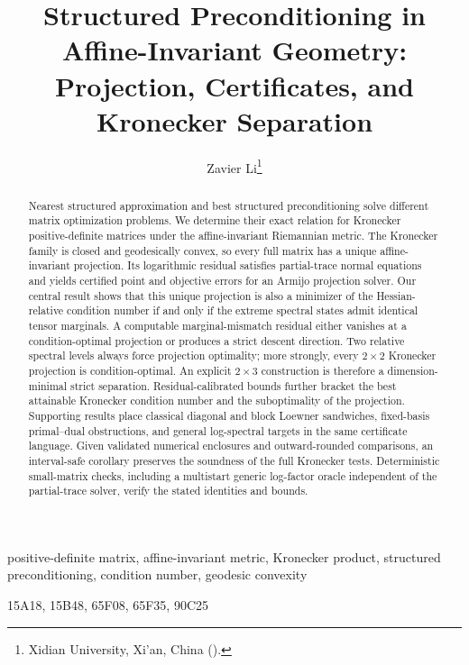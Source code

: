 \documentclass[review,onefignum,onetabnum]{siamart250211}
\title{Structured Preconditioning in Affine-Invariant Geometry:
Projection, Certificates, and Kronecker Separation}
\author{Zavier Li\thanks{Xidian University, Xi'an, China
  (\email{zavierli888@gmail.com}).}}
\begin{document}
\maketitle

\begin{abstract}
Nearest structured approximation and best structured preconditioning solve
different matrix optimization problems.  We determine their exact relation
for Kronecker positive-definite matrices under the affine-invariant
Riemannian metric.  The Kronecker family is closed and geodesically convex, so
every full matrix has a unique affine-invariant projection.  Its logarithmic
residual satisfies partial-trace normal equations and yields certified point
and objective errors for an Armijo projection solver.  Our central result
shows that this unique projection is also a minimizer of the
Hessian-relative condition number if and only if the extreme spectral states
admit identical tensor marginals.  A computable marginal-mismatch residual
either vanishes at a condition-optimal projection or produces a strict
descent direction.  Two relative spectral levels always force projection
optimality; more strongly, every \(2\times2\) Kronecker projection is
condition-optimal.  An explicit \(2\times3\) construction is therefore a
dimension-minimal strict separation.  Residual-calibrated bounds further bracket
the best attainable Kronecker condition number and the suboptimality of the
projection.  Supporting results place classical diagonal and block Loewner
sandwiches, fixed-basis primal--dual obstructions, and general log-spectral
targets in the same certificate language.  Given validated numerical
enclosures and outward-rounded comparisons, an interval-safe corollary
preserves the soundness of the full
Kronecker tests.  Deterministic small-matrix checks, including a multistart generic
log-factor oracle independent of the partial-trace solver, verify the stated
identities and bounds.
\end{abstract}

\begin{keywords}
positive-definite matrix, affine-invariant metric, Kronecker product,
structured preconditioning, condition number, geodesic convexity
\end{keywords}

\begin{MSCcodes}
15A18, 15B48, 65F08, 65F35, 90C25
\end{MSCcodes}












\appendix


\end{document}
